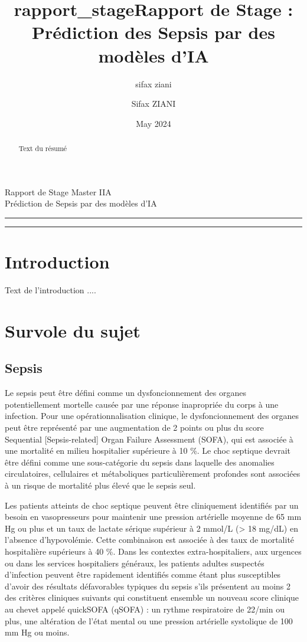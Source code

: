 \documentclass[a4paper,12pt]{article}
\title{rapport_stage}
\author{sifax ziani}
\date{May 2024}
\title{Rapport de Stage : Prédiction des Sepsis par des modèles d'IA}
\author{Sifax ZIANI}
\date{}
\begin{document}

\begin{center}
	\huge{Rapport de Stage Master IIA} \\[11pt]
	\Large{Prédiction de Sepsis par des modèles d'IA}
\end{center}

\rule{\textwidth}{0.5pt}
\begin{abstract}
    Text du résumé
\end{abstract}
\rule{\textwidth}{0.5pt}

\newpage
\tableofcontents
\newpage

\section{Introduction}
    Text de l'introduction ....
\newpage
	
\section{Survole du sujet}
\subsection{Sepsis}
Le sepsis peut être défini comme un dysfoncionnement des organes potentiellement mortelle causée par une réponse inapropriée du corps à une infection. Pour une opérationnalisation clinique, le dysfoncionnement des organes peut être représenté par une augmentation de 2 points ou plus du score Sequential [Sepsis-related] Organ Failure Assessment (SOFA), qui est associée à une mortalité en milieu hospitalier supérieure à 10 \%. Le choc septique devrait être défini comme une sous-catégorie du sepsis dans laquelle des anomalies circulatoires, cellulaires et métaboliques particulièrement profondes sont associées à un risque de mortalité plus élevé que le sepsis seul.

Les patients atteints de choc septique peuvent être cliniquement identifiés par un besoin en vasopresseurs pour maintenir une pression artérielle moyenne de 65 mm Hg ou plus et un taux de lactate sérique supérieur à 2 mmol/L (> 18 mg/dL) en l'absence d'hypovolémie. Cette combinaison est associée à des taux de mortalité hospitalière supérieurs à 40 \%. Dans les contextes extra-hospitaliers, aux urgences ou dans les services hospitaliers généraux, les patients adultes suspectés d'infection peuvent être rapidement identifiés comme étant plus susceptibles d'avoir des résultats défavorables typiques du sepsis s'ils présentent au moins 2 des critères cliniques suivants qui constituent ensemble un nouveau score clinique au chevet appelé quickSOFA (qSOFA) : un rythme respiratoire de 22/min ou plus, une altération de l'état mental ou une pression artérielle systolique de 100 mm Hg ou moins. \cite{bone1992definitions}
\end{document}

